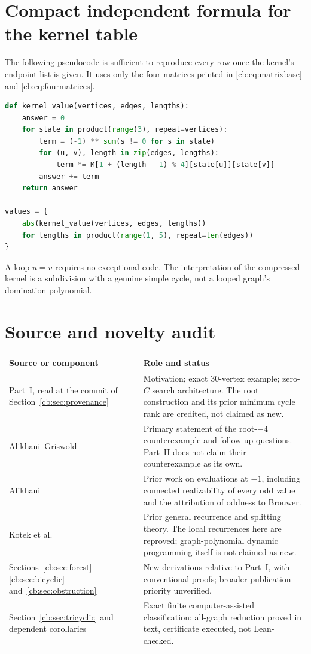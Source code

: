 \documentclass[11pt]{article}
\numberwithin{equation}{section}
\theoremstyle{definition}
\begin{document}
\section{Compact independent formula for the kernel table}\label{cb:app:kernel}

The following pseudocode is sufficient to reproduce every row once the
kernel's endpoint list is given. It uses only the four matrices printed
in \eqref{cb:eq:matrixbase} and \eqref{cb:eq:fourmatrices}.
\begin{lstlisting}[language=Python]
def kernel_value(vertices, edges, lengths):
    answer = 0
    for state in product(range(3), repeat=vertices):
        term = (-1) ** sum(s != 0 for s in state)
        for (u, v), length in zip(edges, lengths):
            term *= M[1 + (length - 1) % 4][state[u]][state[v]]
        answer += term
    return answer

values = {
    abs(kernel_value(vertices, edges, lengths))
    for lengths in product(range(1, 5), repeat=len(edges))
}
\end{lstlisting}
A loop $u=v$ requires no exceptional code. The interpretation of the
compressed kernel is a subdivision with a genuine simple cycle, not a
looped graph's domination polynomial.

\section{Source and novelty audit}\label{cb:app:audit}

\begin{longtable}{p{.28\linewidth}p{.65\linewidth}}
\toprule
Source or component & Role and status\\\midrule
\endhead
Part~I, read at the commit of Section~\ref{cb:sec:provenance} & Motivation; exact 30-vertex example;
zero-$C$ search architecture. The root construction and its prior minimum
cycle rank are credited, not claimed as new.\\
Alikhani--Griswold \cite{AG} & Primary statement of the root-$-4$
counterexample and follow-up questions. Part~II does not claim their
counterexample as its own.\\
Alikhani \cite{AlikhaniMinusOne} & Prior work on evaluations at $-1$,
including connected realizability of every odd value and the attribution
of oddness to Brouwer.\\
Kotek et al.\ \cite{Kotek} & Prior general recurrence and splitting theory.
The local recurrences here are reproved; graph-polynomial dynamic
programming itself is not claimed as new.\\
Sections~\ref{cb:sec:forest}--\ref{cb:sec:bicyclic} and~\ref{cb:sec:obstruction} & New derivations relative to Part~I,
with conventional proofs; broader publication priority unverified.\\
Section~\ref{cb:sec:tricyclic} and dependent corollaries & Exact finite computer-assisted classification;
all-graph reduction proved in text, certificate executed, not Lean-checked.\\
\bottomrule
\end{longtable}
\end{document}

